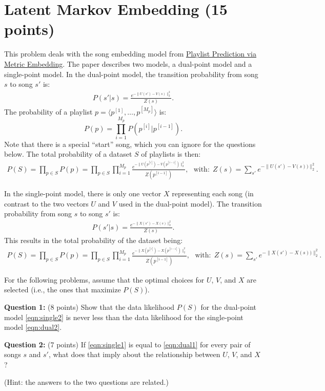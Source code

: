 \section{Latent Markov Embedding (15 points)}

This problem deals with the song embedding model from \href{http://www.cs.cornell.edu/People/tj/publications/chen_etal_12a.pdf}{Playlist Prediction via Metric Embedding}.
The paper describes two models, a dual-point model and a single-point model.
In the dual-point model, the transition probability from song $s$ to song $s'$ is:
\begin{align}
P(s'|s) = \frac{e^{-\|U(s') - V(s)\|_2^2}}{Z(s)}. \label{eqn:single1}
\end{align}
The probability of a playlist $p = \langle p^{[1]}, \ldots, p^{[M_p]}\rangle$ is:
$$P(p) = \prod_{i=1}^{M_p} P(p^{[i]}|p^{[i-1]}).$$
Note that there is a special ``start'' song, which you can ignore for the questions below.
The total probability of a dataset $S$ of playlists is then:
\begin{align}
P(S) = \prod_{p\in S} P(p) = \prod_{p\in S} \prod_{i = 1}^{M_p} \frac{e^{-\|U(p^{[i]}) - V(p^{[i-1]})\|_2^2}}{Z(p^{[i - 1]})},\ \ \ \mbox{with:} \ \ Z(s) = \sum_{s'} e^{-\|U(s') - V(s))\|_2^2}.\label{eqn:single2}
\end{align}

In the single-point model, there is only one vector $X$ representing each song (in contrast to the two vectors $U$ and $V$ used in the dual-point model).
The transition probability from song $s$ to song $s'$ is:
\begin{align}
P(s'|s) = \frac{e^{-\|X(s') - X(s)\|_2^2}}{Z(s)}. \label{eqn:dual1}
\end{align}
This results in the total probability of the dataset being:
\begin{align}
P(S) = \prod_{p\in S} P(p) = \prod_{p\in S} \prod_{i = 1}^{M_p} \frac{e^{-\|X(p^{[i]}) - X(p^{[i-1]})\|_2^2}}{Z(p^{[i - 1]})},\ \ \ \mbox{with:} \ \ Z(s) = \sum_{s'} e^{-\|X(s') - X(s))\|_2^2}.\label{eqn:dual2}
\end{align}

For the following problems, assume that the optimal choices for $U$, $V$, and $X$ are selected (i.e., the ones that maximize $P(S)$).
\smallskip

\textbf{Question 1:} (8 points) 
Show that the data likelihood $P(S)$ for the dual-point model \eqref{eqn:single2} is never less than the data likelihood for the single-point model \eqref{eqn:dual2}.
\smallskip

\textbf{Question 2:} (7 points)
If \eqref{eqn:single1} is equal to \eqref{eqn:dual1} for every pair of songs $s$ and $s'$, what does that imply about the relationship between $U$, $V$, and $X$?

\smallskip
(Hint: the answers to the two questions are related.)
